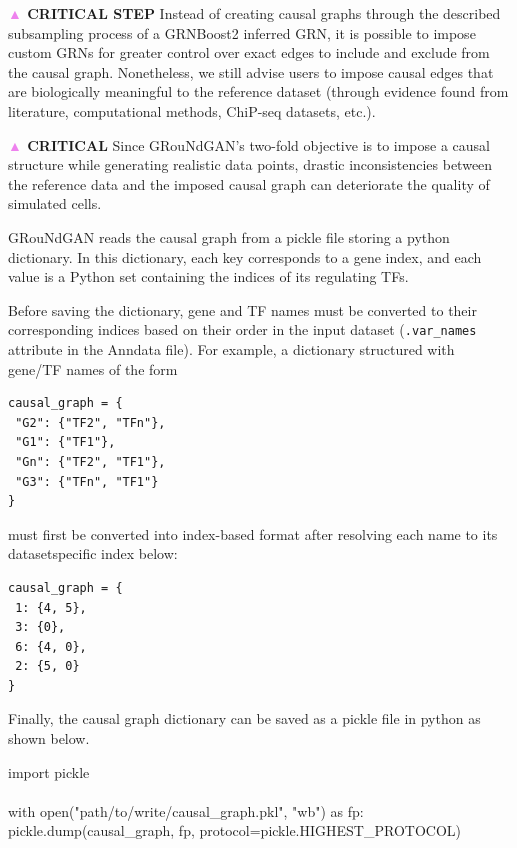 \begin{tcolorbox}
\textbf{\textcolor{violet}{▲} CRITICAL STEP} Instead of creating causal graphs through the described subsampling process
of a GRNBoost2 inferred GRN, it is possible to impose custom GRNs for greater control over exact
edges to include and exclude from the causal graph. Nonetheless, we still advise users to impose
causal edges that are biologically meaningful to the reference dataset (through evidence found
from literature, computational methods, ChiP-seq datasets, etc.). 

\textbf{\textcolor{violet}{▲} CRITICAL} Since GRouNdGAN’s two-fold objective is to impose a causal structure while
generating realistic data points, drastic inconsistencies between the reference data and the
imposed causal graph can deteriorate the quality of simulated cells.  

GRouNdGAN reads the causal graph from a pickle file storing a python dictionary. In this
dictionary, each key corresponds to a gene index, and each value is a Python set containing the
indices of its regulating TFs.

Before saving the dictionary, gene and TF names must be converted to their corresponding
indices based on their order in the input dataset (\texttt{.var\_names} attribute in the Anndata file). For
example, a dictionary structured with gene/TF names of the form
\begin{codeblock}
\begin{verbatim}
causal_graph = {
 "G2": {"TF2", "TFn"},
 "G1": {"TF1"},
 "Gn": {"TF2", "TF1"},
 "G3": {"TFn", "TF1"}
}
\end{verbatim}
\end{codeblock}
must first be converted into index-based format after resolving each name to its datasetspecific index below:

\begin{codeblock}
\begin{verbatim}
causal_graph = {
 1: {4, 5},
 3: {0},
 6: {4, 0},
 2: {5, 0}
}
\end{verbatim}
\end{codeblock}

Finally, the causal graph dictionary can be saved as a pickle file in python as shown below.

\begin{codeblock}
import pickle\\
\\
with open("path/to/write/causal\_graph.pkl", "wb") as fp:\\
 pickle.dump(causal\_graph, fp, protocol=pickle.HIGHEST\_PROTOCOL)
\end{codeblock}


\end{tcolorbox}
